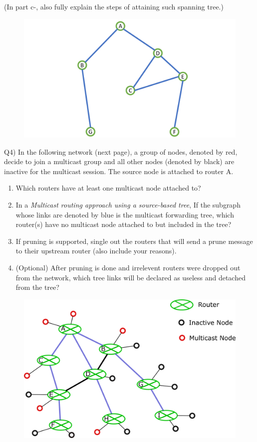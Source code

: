 \documentclass[10pt,letterpaper]{article}
\begin{document}
(In part c-, also fully explain the steps of attaining such spanning tree.)
\begin{figure}[htbp]
\centering
\includegraphics[width=120mm]{broadcast.pdf}
\end{figure}

Q4) In the following network (next page), a group of nodes, denoted by red, decide to join a multicast group and all other nodes (denoted by black) are inactive for the multicast session. The source node is attached to router A.
\begin{enumerate}[label=\alph*-]
\item
Which routers have at least one multicast node attached to?
\item
In a \textit{Multicast routing approach using a source-based tree}, If the subgraph whose links are denoted by blue is the multicast forwarding tree, which router(s) have no multicast node attached to but included in the tree?
\item
If pruning is supported, single out the routers that will send a prune message to their upstream router (also include your reasons).
\item
(Optional) After pruning is done and irrelevent routers were dropped out from the network, which tree links will be declared as useless and detached from the tree?
\end{enumerate}
\begin{figure}[htbp]
\centering
\includegraphics[width=140mm]{multicast.eps}
\end{figure}
\end{document}
